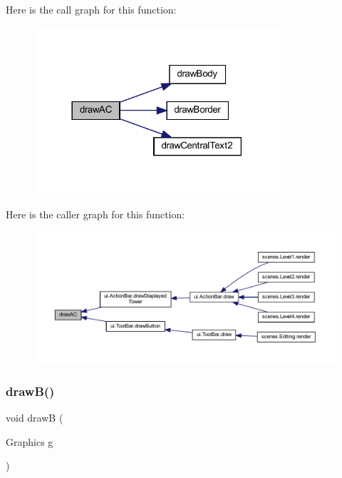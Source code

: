 Here is the call graph for this function\+:\nopagebreak
\begin{figure}[H]
\begin{center}
\leavevmode
\includegraphics[width=258pt]{classui_1_1_my_button_aa8318788e7f26fedd7bfbdd0b654ad45_cgraph}
\end{center}
\end{figure}
Here is the caller graph for this function\+:\nopagebreak
\begin{figure}[H]
\begin{center}
\leavevmode
\includegraphics[width=350pt]{classui_1_1_my_button_aa8318788e7f26fedd7bfbdd0b654ad45_icgraph}
\end{center}
\end{figure}
\mbox{\label{classui_1_1_my_button_a85f135df7a0669cda6dcdf8ca393a90c}} 
\subsubsection{\texorpdfstring{draw\+B()}{drawB()}}
{\footnotesize\ttfamily void drawB (\begin{DoxyParamCaption}\item[{Graphics}]{g }\end{DoxyParamCaption})}



